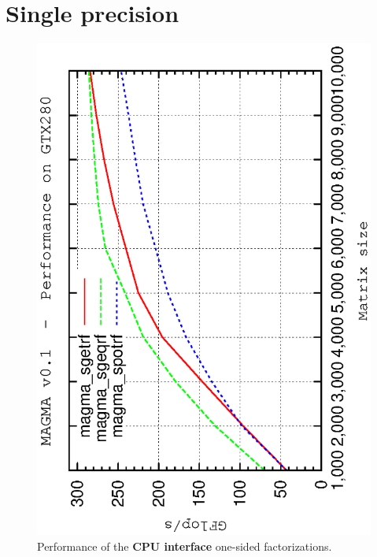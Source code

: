 \documentclass[10pt]{book}
\begin{document}
\newpage
\section{Single precision}

       \begin{figure}[!ht]
          \centering
          \hspace{-5mm}
          \includegraphics[angle=-90,scale=0.7]{sp-cpu.ps}
          \caption{Performance of the {\bf CPU interface} 
                   one-sided factorizations.}
       \label{sp-cpu-performance}
       \end{figure}
\end{document}
